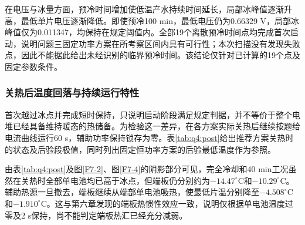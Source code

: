 在电压与冰量方面，预冷时间增加使低温产水持续时间延长，局部冰峰值逐渐升高，最低单片电压逐渐降低。即使预冷100 min，最低电压仍为0.66329 V，局部冰峰值仅为0.011347，均保持在规定阈值内。全部19个离散预冷时间点均完成首次启动，说明问题三固定功率方案在所考察区间内具有可行性；本次扫描没有发现失败点，因此不能据此给出未经识别的临界预冷时间。该结论仅针对已计算的19个点及固定参数条件。

\subsubsection{关热后温度回落与持续运行特性}

首次越过冰点并完成短时保持，只说明启动阶段满足规定判据，并不等价于整个电堆已经具备维持暖态的热储备。为检验这一差异，在各方案实际关热后继续按题给电流曲线运行60 s，辅助功率保持锁存为零。表\ref{tab:q4:post}给出推荐方案关热时的状态及后验段极值，同时列出固定恒功率方案的后验最低温度作为参照。

\begin{table}[htbp]
    \centering
    \caption{推荐动态策略关热状态及关热后60 s的运行结果}
    \vspace{0.3cm}
    \label{tab:q4:post}
    \renewcommand{\arraystretch}{1.5}
\end{table}

由表\ref{tab:q4:post}及图\ref{F7-2}、图\ref{F7-4}的阴影部分可见，完全冷却和40 min工况虽然在关热时全部单电池均已高于冰点，但端板仍分别约为\(-14.47^\circ\mathrm C\)和\(-10.29^\circ\mathrm C\)。辅助热源一旦撤去，端板继续从端部单电池吸热，使最低片温分别降至\(-4.508^\circ\mathrm C\)和\(-1.910^\circ\mathrm C\)。这与第六章发现的端板热惯性效应一致，说明仅根据单电池温度过零及2 s保持，尚不能判定端板热汇已经充分减弱。

